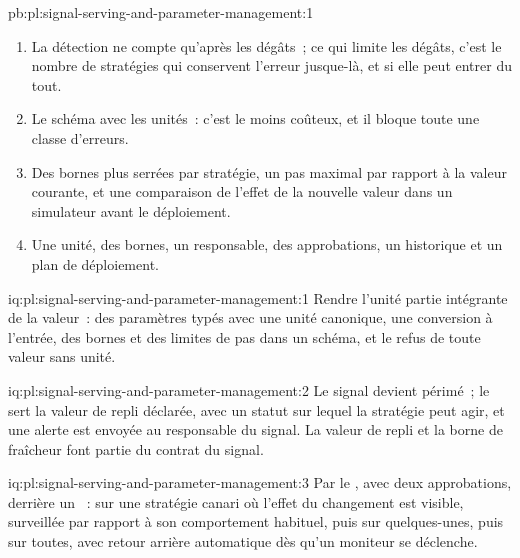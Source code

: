 \begin{solution}{pb:pl:signal-serving-and-parameter-management:1}
\begin{enumerate}
de dollars-minute~; déploiement progressif~: 15 minutes, 30\,000~\$ et 53\,000 dollars-minute~; contrôle du schéma~: refusé à l'entrée, aucune exposition.
\item La détection ne compte qu'après les dégâts~; ce qui limite les dégâts, c'est le nombre de stratégies qui conservent l'erreur jusque-là, et si elle peut entrer
du tout.
\item Le schéma avec les unités~: c'est le moins coûteux, et il bloque toute une classe d'erreurs.
\item Des bornes plus serrées par stratégie, un pas maximal par rapport à la valeur courante, et une comparaison de l'effet de la nouvelle valeur dans un simulateur
avant le déploiement.
\item Une unité, des bornes, un responsable, des approbations, un historique et un plan de déploiement.
\end{enumerate}
\end{solution}

\begin{solution}{iq:pl:signal-serving-and-parameter-management:1}
Rendre l'unité partie intégrante de la valeur~: des paramètres typés avec une unité canonique, une conversion à l'entrée, des bornes et des limites de pas dans un schéma, et le refus
de toute valeur sans unité.
\end{solution}

\begin{solution}{iq:pl:signal-serving-and-parameter-management:2}
Le signal devient périmé~; le  sert la valeur de repli déclarée, avec un statut sur lequel la stratégie peut agir, et une alerte est envoyée au responsable du signal.
La valeur de repli et la borne de fraîcheur font partie du contrat du signal.
\end{solution}

\begin{solution}{iq:pl:signal-serving-and-parameter-management:3}
Par le , avec deux approbations, derrière un ~: sur une stratégie canari où l'effet du changement est visible, surveillée par rapport
à son comportement habituel, puis sur quelques-unes, puis sur toutes, avec retour arrière automatique dès qu'un moniteur se déclenche.
\end{solution}

